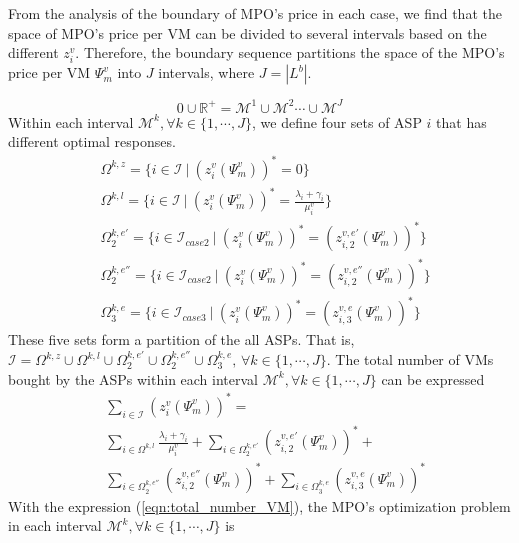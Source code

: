 \documentclass[conference]{IEEEtran}
\begin{document}
From the analysis of the boundary of MPO's price in each case, we find that the space of MPO's price per VM can be divided to several intervals based on the different $z_i^v$. Therefore, the boundary sequence partitions the space of the MPO's price per VM $\Psi_m^v$ into $J$ intervals, where $J = |L^b|$.

\begin{equation}
0 \cup \mathbb{R}^{+} = \mathcal{M}^1 \cup \mathcal{M}^2 \cdots \cup \mathcal{M}^{J}
\end{equation}
Within each interval $\mathcal{M}^k, \forall k \in \{1, \cdots, J\}$, we define four sets of ASP $i$ that has different optimal responses.
\begin{equation}
\begin{aligned}
&\Omega^{k,z} = \{i \in \mathcal{I}\ |\ (z_{i}^v(\Psi_m^v))^* = 0\} \\
&\Omega^{k,l} = \{i \in \mathcal{I}\ |\ (z_{i}^v(\Psi_m^v))^* = \frac{\lambda_i + \gamma_i}{\mu_i^v}\} \\
&\Omega^{k,e'}_{2} = \{i \in \mathcal{I}_{case2}\ |\ (z_{i}^v(\Psi_m^v))^* = (z_{i,2}^{v,e'}(\Psi_m^v))^*\}\\
&\Omega^{k,e''}_{2} = \{i \in \mathcal{I}_{case2}\ |\ (z_{i}^v(\Psi_m^v))^* = (z_{i,2}^{v,e''}(\Psi_m^v))^*\}\\
&\Omega^{k,e}_{3} = \{i \in \mathcal{I}_{case3}\ |\ (z_{i}^v(\Psi_m^v))^* = (z_{i,3}^{v,e}(\Psi_m^v))^*\}
\end{aligned}
\end{equation}
These five sets form a partition of the all ASPs. That is, $\mathcal{I} = \Omega^{k,z} \cup \Omega^{k,l} \cup \Omega^{k,e'}_{2} \cup \Omega^{k,e''}_{2} \cup \Omega^{k,e}_{3}, \, \forall k \in \{1, \cdots, J\}$. The total number of VMs bought by the ASPs within each interval $\mathcal{M}^k, \forall k \in \{1, \cdots, J\}$ can be expressed
\begin{equation}\label{eqn:total_number_VM}
\begin{aligned}
&\sum_{i \in \mathcal{I}} (z_{i}^v(\Psi_m^v))^* = \\
&\sum_{i\in \Omega^{k,l}}\frac{\lambda_i + \gamma_i}{\mu_i^v}
+ \sum_{i\in \Omega^{k,e'}_{2}}(z_{i,2}^{v,e'}(\Psi_m^v))^* +\\
&\sum_{i\in \Omega^{k,e''}_{2}}(z_{i,2}^{v,e''}(\Psi_m^v))^*
+ \sum_{i \in \Omega_3^{k,e}}(z_{i,3}^{v,e}(\Psi_m^v))^*
\end{aligned}
\end{equation}
With the expression (\ref{eqn:total_number_VM}), the MPO's optimization problem in each interval $\mathcal{M}^k, \forall k \in \{1, \cdots, J\}$ is
\end{document}
